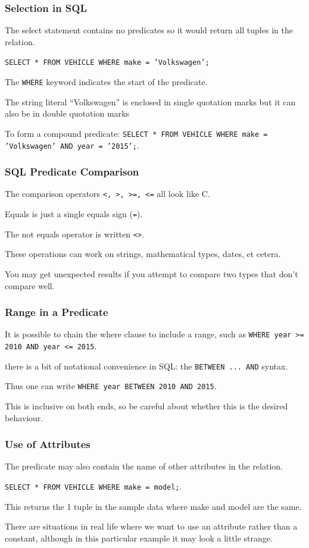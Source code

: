 \begin{frame}
\frametitle{Selection in SQL}

The select statement contains no predicates so it would return all tuples in the relation. 

\texttt{SELECT * FROM VEHICLE WHERE make = 'Volkswagen';}

The \texttt{WHERE} keyword indicates the start of the predicate. 

The string literal ``Volkswagen'' is enclosed in single quotation marks but it can also be in double quotation marks  

To form a compound predicate: \texttt{SELECT * FROM VEHICLE WHERE make = 'Volkswagen' AND year = '2015';}. 


\end{frame}



\begin{frame}
\frametitle{SQL Predicate Comparison}

The comparison operators \texttt{<, >, >=, <=} all look like C. 

Equals is just a single equals sign (\texttt{=}). 

The not equals operator is written \texttt{<>}. 

These operations can work on strings, mathematical types, dates, et cetera. 

You may get unexpected results if you attempt to compare two types that don't compare well.

\end{frame}



\begin{frame}
\frametitle{Range in a Predicate}

It is possible to chain the where clause to include a range, such as \texttt{WHERE year >= 2010 AND year <= 2015}.

there is a bit of notational convenience in SQL: the \texttt{BETWEEN ... AND} syntax. 

Thus one can write \texttt{WHERE year BETWEEN 2010 AND 2015}. 

This is inclusive on both ends, so be careful about whether this is the desired behaviour. 

\end{frame}



\begin{frame}
\frametitle{Use of Attributes}

The predicate may also contain the name of other attributes in the relation.

\texttt{SELECT * FROM VEHICLE WHERE make = model;}. 

This returns the 1 tuple in the sample data where make and model are the same. 

There are situations in real life where we want to use an attribute rather than a constant, although in this particular example it may look a little strange.

\end{frame}



